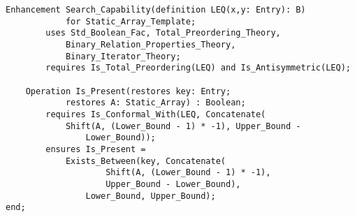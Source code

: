 \begin{lstlisting}[language=resolve]
Enhancement Search_Capability(definition LEQ(x,y: Entry): B)
			for Static_Array_Template;
		uses Std_Boolean_Fac, Total_Preordering_Theory,
			Binary_Relation_Properties_Theory, 
			Binary_Iterator_Theory;
		requires Is_Total_Preordering(LEQ) and Is_Antisymmetric(LEQ);

	Operation Is_Present(restores key: Entry; 
			restores A: Static_Array) : Boolean;
		requires Is_Conformal_With(LEQ, Concatenate(
			Shift(A, (Lower_Bound - 1) * -1), Upper_Bound - 
				Lower_Bound));
		ensures Is_Present = 
			Exists_Between(key, Concatenate(
					Shift(A, (Lower_Bound - 1) * -1), 
					Upper_Bound - Lower_Bound), 
				Lower_Bound, Upper_Bound);
end;
\end{lstlisting}
